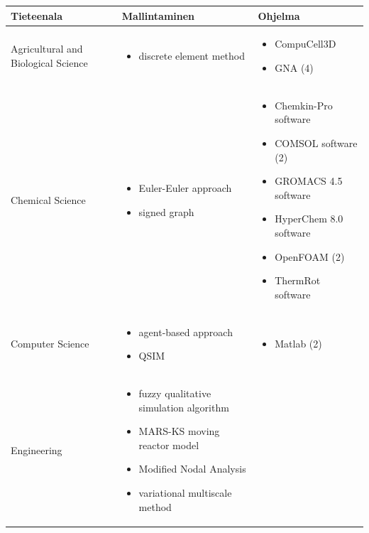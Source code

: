 \documentclass[utf8]{gradu3}
\begin{document}
\begin{longtable}[h]{|p{4cm}|p{5cm}|p{5cm}|}
    \hline
    \textbf{Tieteenala}    &    \textbf{Mallintaminen}  &  \textbf{Ohjelma}\\
    \hline
    Agricultural and Biological Science & 
    \begin{itemize}
        \item discrete element method
    \end{itemize} &
    \begin{itemize}
        \item CompuCell3D
        \item GNA (4)
    \end{itemize} 
    \\
    \hline
    Chemical Science & \begin{itemize}
        \item Euler-Euler approach
        \item signed graph
    \end{itemize} &
    \begin{itemize}
        \item Chemkin-Pro software
        \item COMSOL software (2)
        \item GROMACS 4.5 software
        \item HyperChem 8.0 software
        \item OpenFOAM (2)
        \item ThermRot software
    \end{itemize} 
    \\
    \hline
    Computer Science & \begin{itemize}
        \item agent-based approach
        \item QSIM
    \end{itemize} &
    \begin{itemize}
        \item Matlab (2)
    \end{itemize} 
    \\
    \hline
    Engineering & \begin{itemize}
        \item fuzzy qualitative simulation algorithm
        \item MARS-KS moving reactor model
        \item Modified Nodal Analysis
        \item variational multiscale method
    \end{itemize} &

\end{longtable}
\end{document}
